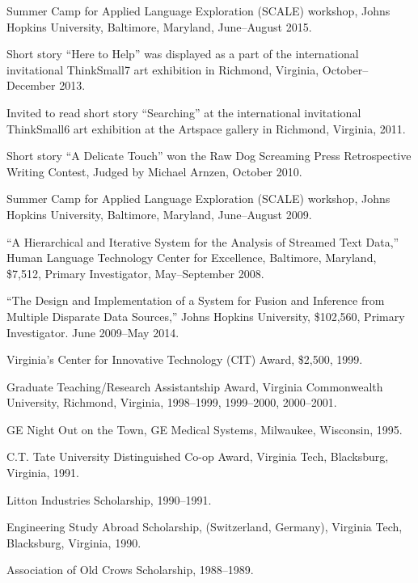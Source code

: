 \documentclass[11pt,article,oneside]{memoir}
\begin{document}
\ind Summer Camp for Applied Language Exploration (SCALE) workshop, Johns Hopkins University, Baltimore, Maryland, June--August 2015.

\ind Short story “Here to Help” was displayed as a part of the international invitational ThinkSmall7 art exhibition in Richmond, Virginia, October--December 2013.

\ind Invited to read short story “Searching” at the international invitational ThinkSmall6 art exhibition at the Artspace gallery in Richmond, Virginia, 2011.

\ind Short story “A Delicate Touch” won the Raw Dog Screaming Press Retrospective Writing Contest, Judged by Michael Arnzen, October 2010.

\ind Summer Camp for Applied Language Exploration (SCALE) workshop, Johns Hopkins University, Baltimore, Maryland, June--August 2009.

\ind “A Hierarchical and Iterative System for the Analysis of Streamed Text Data,” Human Language Technology Center for Excellence, Baltimore, Maryland, \$7,512, Primary Investigator, May--September 2008.

\ind “The Design and Implementation of a System for Fusion and Inference from Multiple Disparate Data Sources,” Johns Hopkins University, \$102,560, Primary Investigator.  June 2009--May 2014.

\ind Virginia’s Center for Innovative Technology (CIT) Award, \$2,500, 1999.

\ind Graduate Teaching/Research Assistantship Award, Virginia Commonwealth University, Richmond, Virginia, 1998--1999, 1999--2000, 2000--2001.

\ind GE Night Out on the Town, GE Medical Systems, Milwaukee, Wisconsin, 1995.

\ind C.T. Tate University Distinguished Co-op Award, Virginia Tech, Blacksburg, Virginia, 1991.

\ind Litton Industries Scholarship, 1990--1991.

\ind Engineering Study Abroad Scholarship, (Switzerland, Germany), Virginia Tech, Blacksburg, Virginia, 1990.

\ind Association of Old Crows Scholarship, 1988--1989.






\end{document}
